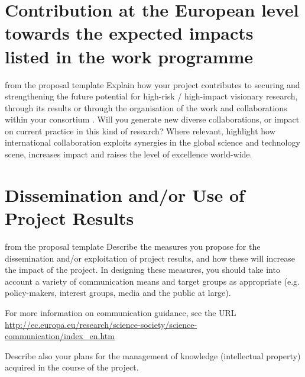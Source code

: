 \section{Contribution at the European level towards the expected impacts listed in the work programme}\label{sec:european-contribution}
\begin{todo}{from the proposal template}
      Explain how your project contributes to securing and strengthening the future potential for high-risk / high-impact visionary research, through its results or through the organisation of the work and collaborations within your consortium . Will you generate new diverse collaborations, or impact on current practice in this kind of research? Where relevant, highlight how international collaboration exploits synergies in the global science and technology scene, increases impact and raises the level of excellence world-wide.
\end{todo}

\section{Dissemination and/or Use of Project Results}\label{sec:outreach}

\begin{todo}{from the proposal template}
      Describe the measures you propose for the dissemination and/or exploitation of project results, and how these will increase the impact of the project. In designing these measures, you should take into account a variety of communication means and target groups as appropriate (e.g. policy-makers, interest groups, media and the public at large).

For more information on communication guidance, see the URL \url{http://ec.europa.eu/research/science-society/science-communication/index_en.htm}

      Describe also your plans for the management of knowledge (intellectual property) acquired in the course of the project.
\end{todo}



